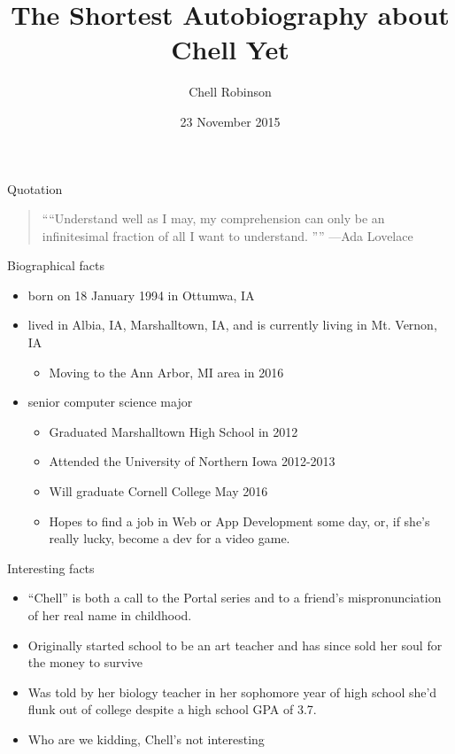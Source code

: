 \documentclass{beamer}
\title{The Shortest Autobiography about Chell Yet}
\author{Chell Robinson}
\institute{Cornell College}
\date{23 November 2015}
\begin{document}
\begin{frame}
  \titlepage
\end{frame}

\begin{frame}{Quotation}
\begin{quotation}
\noindent
``“Understand well as I may, my comprehension can only be an infinitesimal fraction of all I want to understand. ”''
  \flushright
  ---Ada Lovelace
  \end{quotation}
\end{frame}

\begin{frame}{Biographical facts}
\begin{itemize}
  \item born on 18 January 1994 in Ottumwa, IA
  \item lived in Albia, IA, Marshalltown, IA, and is currently living in Mt. Vernon, IA
    \begin{itemize}
      \item Moving to the Ann Arbor, MI area in 2016
  \end{itemize}
  \item senior computer science major
    \begin{itemize}
      \item Graduated Marshalltown High School in 2012 
      \item Attended the University of Northern Iowa 2012-2013
      \item Will graduate Cornell College May 2016
      \item Hopes to find a job in Web or App Development some day, or, if she's really lucky, become a dev for a video game.
      \end{itemize}
  \end{itemize}
\end{frame}

\begin{frame}{Interesting facts}
\begin{itemize}
  \item ``Chell'' is both a call to the Portal series and to a friend's mispronunciation of her real name in childhood.
  \item Originally started school to be an art teacher and has since sold her soul for the money to survive
  \item Was told by her biology teacher in her sophomore year of high school she'd flunk out of college despite a high school GPA of 3.7. 
  \item Who are we kidding, Chell's not interesting
  \end{itemize}
\end{frame}
\end{document}

